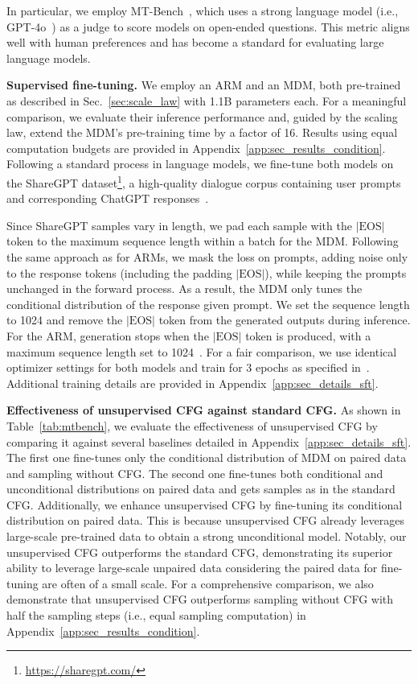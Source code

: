 \documentclass{article} %
\begin{document}
In particular, we employ MT-Bench~\citep{zheng2023judging}, which uses a strong language model (i.e., GPT-4o~\citep{achiam2023gpt}) as a judge to score models on open-ended questions. This metric aligns well with human preferences and has become a standard for evaluating large language models.

\textbf{Supervised fine-tuning.} We employ an ARM and an MDM, both pre-trained as described in Sec.~\ref{sec:scale_law} with 1.1B parameters each. 
For a meaningful comparison, we evaluate their inference performance and, guided by the scaling law, extend the MDM's pre-training time by a factor of 16. Results using equal computation budgets are provided in Appendix~\ref{app:sec_results_condition}.
Following a standard process in language models, we fine-tune both models on the ShareGPT dataset\footnote{\url{https://sharegpt.com/}}, a high-quality dialogue corpus containing user prompts and corresponding ChatGPT responses~\citep{chatgpt}.

Since ShareGPT samples vary in length, we pad each sample with the $|\text{EOS}|$ token to the maximum sequence length within a batch for the MDM. Following the same approach as for ARMs, we mask the loss on prompts, adding noise only to the response tokens (including the padding $|\text{EOS}|$), while keeping the prompts unchanged in the forward process. As a result, the MDM only tunes the conditional distribution of the response given prompt. We set the sequence length to 1024 and remove the $|\text{EOS}|$ token from the generated outputs during inference. For the ARM, generation stops when the $|\text{EOS}|$ token is produced, with a maximum sequence length set to 1024~\citep{zheng2023judging}. For a fair comparison, we use identical optimizer settings for both models and train for 3 epochs as specified in~\cite{zheng2023judging}. Additional training details are provided in Appendix~\ref{app:sec_details_sft}.

\textbf{Effectiveness of unsupervised CFG against standard CFG.} As shown in Table~\ref{tab:mtbench}, we evaluate the effectiveness of unsupervised CFG by comparing it against several baselines detailed in Appendix~\ref{app:sec_details_sft}. The first one fine-tunes only the conditional distribution of MDM on paired data and sampling without CFG. The second one fine-tunes both conditional and unconditional distributions on paired data and gets samples as in the standard CFG. Additionally, we enhance unsupervised CFG by fine-tuning its conditional distribution on paired data. This is because unsupervised CFG already leverages large-scale pre-trained data to obtain a strong unconditional model.
Notably, our unsupervised CFG outperforms the standard CFG, demonstrating its superior ability to leverage large-scale unpaired data considering the paired data for fine-tuning are often of a small scale. For a comprehensive comparison, we also demonstrate that unsupervised CFG outperforms sampling without CFG with half the sampling steps (i.e., equal sampling computation) in Appendix~\ref{app:sec_results_condition}.
\end{document}
